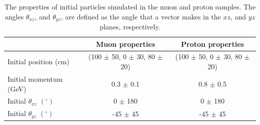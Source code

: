 \begin{table}
\caption{The properties of initial particles simulated in the muon and proton samples. The angles $\theta_{xz}$, and $\theta_{yz}$, are defined as the angle that a vector makes in the $xz$, and $yz$ planes, respectively.}
\centering
\label{tab:IsolProp}
\begin{tabular}{l c c}
\toprule
{} & {Muon properties} & {Proton properties} \\ 
\midrule
Initial position (cm)              & (100 $\pm$ 50, 0 $\pm$ 30, 80 $\pm$ 20) & (100 $\pm$ 50, 0 $\pm$ 30, 80 $\pm$ 20)  \\

Initial momentum (GeV)            & 0.3 $\pm$ 0.1 & 0.8 $\pm$ 0.5 \\

Initial $\theta_{xz}$ $(^{\circ})$ &   0 $\pm$ 180 &   0 $\pm$ 180 \\

Initial $\theta_{yz}$ $(^{\circ})$ & -45 $\pm$ 45  & -45 $\pm$ 45  \\
\bottomrule
\end{tabular}
\end{table}

